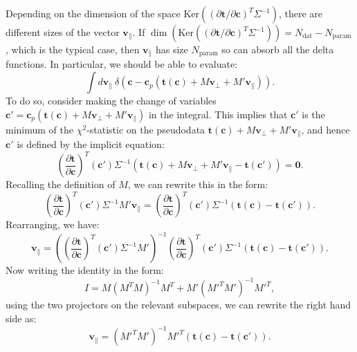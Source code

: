 \documentclass[withindex,glossary]{cam-thesis}
\renewcommand{\vec}[1]{\textbf{#1}} %
\begin{document}
Depending on the dimension of the space $\textrm{Ker}((\partial \vec{t} / \partial \vec{c})^T \Sigma^{-1})$, there are different sizes of the vector $\vec{v}_{\parallel}$. If $\dim(\textrm{Ker}((\partial \vec{t} / \partial \vec{c})^T \Sigma^{-1})) = N_{\text{dat}} - N_{\text{param}}$, which is the typical case, then $\vec{v}_{\parallel}$ has size $N_{\text{param}}$ so can absorb all the delta functions. In particular, we should be able to evaluate:
\begin{equation}
\int d\vec{v}_{\parallel}\ \delta\left(\vec{c} - \vec{c}_p\left(\vec{t}(\vec{c}) + M\vec{v}_{\perp} + M'\vec{v}_{\parallel}\right) \right).
\end{equation}
To do so, consider making the change of variables $\vec{c}' = \vec{c}_p(\vec{t}(\vec{c}) + M\vec{v}_{\perp} + M'\vec{v}_{\parallel})$ in the integral. This implies that $\vec{c}'$ is the minimum of the $\chi^2$-statistic on the pseudodata $\vec{t}(\vec{c}) + M\vec{v}_{\perp} + M'\vec{v}_{\parallel}$, and hence $\vec{c}'$ is defined by the implicit equation:
\begin{equation}
\left( \frac{\partial \vec{t}}{\partial \vec{c}} \right)^T (\vec{c}') \Sigma^{-1} \left( \vec{t}(\vec{c}) + M\vec{v}_{\perp} + M'\vec{v}_{\parallel} - \vec{t}(\vec{c}') \right) = \vec{0}.
\end{equation}
Recalling the definition of $M$, we can rewrite this in the form:
\begin{equation}
\left( \frac{\partial \vec{t}}{\partial \vec{c}} \right)^T (\vec{c}') \Sigma^{-1} M' \vec{v}_{\parallel} = \left( \frac{\partial \vec{t}}{\partial \vec{c}} \right)^T (\vec{c}') \Sigma^{-1} \left( \vec{t}(\vec{c}) - \vec{t}(\vec{c}') \right).
\end{equation}
Rearranging, we have:
\begin{equation}
\vec{v}_{\parallel} = \left( \left( \frac{\partial \vec{t}}{\partial \vec{c}} \right)^T (\vec{c}') \Sigma^{-1} M' \right)^{-1} \left( \frac{\partial \vec{t}}{\partial \vec{c}} \right)^T (\vec{c}') \Sigma^{-1} \left( \vec{t}(\vec{c}) - \vec{t}(\vec{c}') \right).
\end{equation}
Now writing the identity in the form:
\begin{equation}
I = M(M^TM)^{-1} M^T + M'({M'}^T M')^{-1} {M'}^T,
\end{equation}
using the two projectors on the relevant subspaces, we can rewrite the right hand side as:
\begin{equation}
\vec{v}_{\parallel} = ({M'}^T M')^{-1} {M'}^T(\vec{t}(\vec{c}) - \vec{t}(\vec{c}')).
\end{equation}
\end{document}
